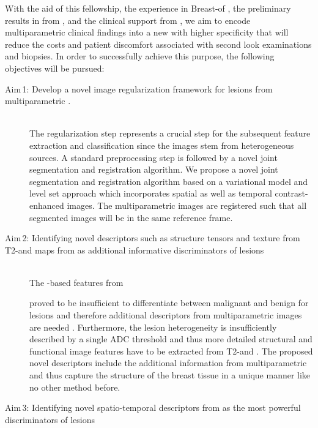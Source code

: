 With the aid of this fellowship, the experience in Breast-\cad of \vicorob, the preliminary results in \cemri from \florida, and the clinical support from \udiat, we aim to encode multiparametric \mri clinical findings into a new \cad with higher specificity that will reduce the costs and patient discomfort associated with second look examinations and biopsies.
In order to successfully achieve this purpose, the following objectives will be pursued:

\begin{description}
\item [Aim\,1: Develop a novel image regularization framework for \nmle lesions from multiparametric \mri.] \hfill \\
  The regularization step represents a crucial step for the subsequent feature
  extraction and classification since the images stem from heterogeneous
  sources. A standard preprocessing step is followed by a novel joint
  segmentation and registration algorithm. We propose a novel joint
  segmentation and registration algorithm based on a variational model and
  level set approach which incorporates spatial as well as temporal
  contrast-enhanced images.
  The multiparametric images are registered such that all segmented images will
  be in the same reference frame.

  \item [Aim\,2: Identifying novel descriptors such as structure tensors and texture from T2-\mri and \ivim maps from \dwi as additional informative discriminators of \nmle lesions] \hfill \\
    The \birads-based features from \cemri

    proved to be insufficient to differentiate between malignant and benign for
    \nmle lesions and therefore additional descriptors from multiparametric
    images are needed . Furthermore, the lesion heterogeneity is
    insufficiently described by a single ADC threshold
    and thus more detailed structural and functional image features have to be
    extracted from T2-\mri and \dwi. The proposed novel descriptors include the
    additional information from multiparametric \mri and thus capture the
    structure of the breast tissue in a unique manner like no other method
    before.

  \item [Aim\,3: Identifying novel spatio-temporal descriptors from \cemri as the most powerful discriminators of \nmle lesions]
  \hfill \\


\end{description}
